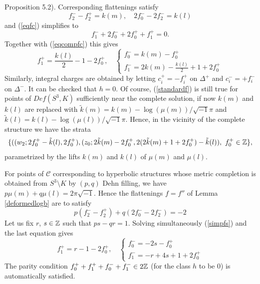 Proposition 5.2). Corresponding flattenings satisfy
\begin{equation}\label{eqcompfc}f_2^--f_2^+ = k(m),\quad2f_0^--2f_2^-=k(l)
\end{equation}
and (\ref{eqfc}) simplifies to
\begin{equation}\label{simpfs}
f_1^-+2f_0^-+2f_0^++f_1^+=0.
\end{equation}
Together with (\ref{eqcompfc}) this gives
\begin{equation}\label{standardf} f_1^+ = \frac{k(l)}
{2}-1-2f_0^+,\quad \left\lbrace \begin{array}{l} f_0^-=k(m)-f_0^+\\
    f_1^- = 2k(m)-\frac{k(l)}{2}+1+2f_0^+\end{array}\right.
\end{equation}
Similarly, integral charges are obtained by letting $c_i^+ = -f_i^+$
on $\Delta^+$ and $c_i^- = +f_i^-$ on $\Delta^-$. It can be checked
that $h=0$. Of course, (\ref{standardf}) is still true for points of
$Def(S^3,K)$ sufficiently near the complete solution, if now $k(m)$
and $k(l)$ are replaced with
$\tilde{k}(m)=k(m)-\log(\mu(m))/\sqrt{-1}\pi$ and
$\tilde{k}(l)=k(l)-\log(\mu(l))/\sqrt{-1}\pi$. Hence, in the vicinity
of the complete structure we have the strata
$$\{((w_2;2f_0^+-\tilde{k}(l),2f_0^+),(z_0;2\tilde{k}(m)-2f_0^+,
2(2\tilde{k}(m)+1+2f_0^+)-\tilde{k}(l)),\ f_0^+ \in \mathbb{Z}\},$$
parametrized by the lifts $k(m)$ and $k(l)$ of $\mu(m)$ and $\mu(l)$.
\smallskip

For points of $\mathcal{C}$ corresponding to hyperbolic structures
whose metric completion is obtained from $S^3 \setminus K$ by $(p,q)$
Dehn filling, we have $p\mu(m) +q\mu(l) = 2\pi \sqrt{-1}$. Hence the
flattenings $f=f''$ of Lemma \ref{deformedlogb} are to satisfy
$$p(f_2^--f_2^+)+q(2f_0^--2f_2^-)=-2$$ Let us fix $r$, $s \in \mathbb{Z}$
such that $ps-qr=1$. Solving simultaneously (\ref{simpfs}) and the
last equation gives
\begin{equation}\label{surgf}
f_1^+ = r-1-2f_0^+,\quad \left\lbrace \begin{array}{l}
    f_0^-=-2s-f_0^+\\ f_1^- = -r+4s+1+2f_0^+\end{array}\right.
\end{equation}
The parity condition $f_0^++f_1^++f_0^-+f_1^- \in 2\mathbb{Z}$ (for the class
$h$ to be $0$) is automatically satisfied.
\smallskip

